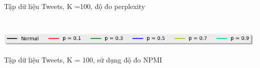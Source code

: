 \documentclass[pdf]{beamer}
\begin{document}
\begin{frame}{Tập dữ liệu Tweets, K =100, độ đo perplexity}
\begin{columns}[T]
\begin{column}{.50\textwidth}
\begin{figure}
		\end{figure}				
	\end{column} %
\end{columns}
\begin{center}
	\includegraphics[width=1\textwidth]{menu.png}	
\end{center}
\end{frame}

\begin{frame}{Tập dữ liệu Tweets, K = 100, sử dụng độ đo NPMI }
\begin{columns}[T] %
\begin{column}{.50\textwidth}
	\begin{figure}
	\end{figure}
\end{column} %
\hfill%
\begin{column}{.50\textwidth}
	\begin{figure}

\end{figure}
\end{column}
\end{columns}
\end{frame}
\end{document}
